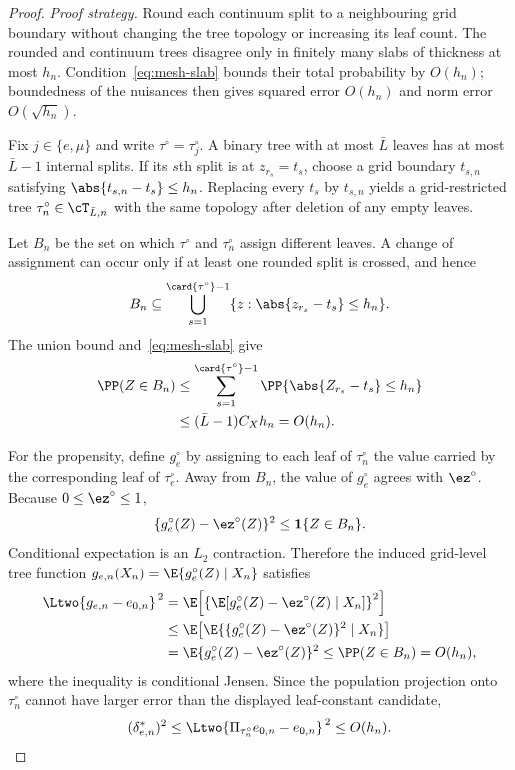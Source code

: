 \begin{proof}
\emph{Proof strategy.}
Round each continuum split to a neighbouring grid boundary without changing
the tree topology or increasing its leaf count.  The rounded and continuum
trees disagree only in finitely many slabs of thickness at most $h_n$.
Condition~\eqref{eq:mesh-slab} bounds their total probability by $O(h_n)$;
boundedness of the nuisances then gives squared error $O(h_n)$ and norm error
$O(\sqrt{h_n})$.

Fix $j\in\{e,\mu\}$ and write $\tau^\circ=\tau_j^\circ$.  A binary tree with
at most $\bar L$ leaves has at most $\bar L-1$ internal splits.  If its $s$th
split is at $z_{r_s}=t_s$, choose a grid boundary $t_{s,n}$ satisfying
$\abs{t_{s,n}-t_s}\le h_n$.  Replacing every $t_s$ by $t_{s,n}$ yields a
grid-restricted tree $\tau_n^\circ\in\cT_{\bar L,n}$ with the same topology
after deletion of any empty leaves.

Let $B_n$ be the set on which $\tau^\circ$ and $\tau_n^\circ$ assign different
leaves.  A change of assignment can occur only if at least one rounded split
is crossed, and hence
\[
  B_n
  \subseteq
  \bigcup_{s=1}^{\card{\tau^\circ}-1}
  \{z:\abs{z_{r_s}-t_s}\le h_n\}.
\]
The union bound and~\eqref{eq:mesh-slab} give
\begin{align}
  \PP(Z\in B_n)
  &\le
  \sum_{s=1}^{\card{\tau^\circ}-1}
  \PP\{\abs{Z_{r_s}-t_s}\le h_n\}  \\
  &\le (\bar L-1)C_Xh_n
  =O(h_n).
  \label{eq:mesh-boundary-mass}
\end{align}

For the propensity, define $g^\circ_e$ by assigning to each leaf of
$\tau_n^\circ$ the value carried by the corresponding leaf of
$\tau_e^\circ$.  Away from $B_n$, the value of $g^\circ_e$ agrees with
$\ez^\circ$.  Because $0\le\ez^\circ\le1$,
\[
  \{g^\circ_e(Z)-\ez^\circ(Z)\}^2
  \le \mathbf1\{Z\in B_n\}.
\]
Conditional expectation is an $L_2$ contraction.  Therefore the induced
grid-level tree function $g_{e,n}(X_n)
=\E\{g^\circ_e(Z)\mid X_n\}$ satisfies
\begin{align}
  \Ltwo{g_{e,n}-\ezn}^{\,2}
  &=
  \E\!\left[
    \left\{
      \E[g^\circ_e(Z)-\ez^\circ(Z)\mid X_n]
    \right\}^{2}
  \right] \\
  &\le
  \E\!\left[
    \E\{\{g^\circ_e(Z)-\ez^\circ(Z)\}^{2}\mid X_n\}
  \right] \\
  &=
  \E\{g^\circ_e(Z)-\ez^\circ(Z)\}^{2}
  \le \PP(Z\in B_n)
  =O(h_n),
\end{align}
where the inequality is conditional Jensen.  Since the population projection
onto $\tau_n^\circ$ cannot have larger error than the displayed leaf-constant
candidate,
\[
  (\delta^*_{e,n})^2
  \le \Ltwo{\Pi_{\tau_n^\circ}\ezn-\ezn}^{\,2}
  \le O(h_n).
\]


\end{proof}
